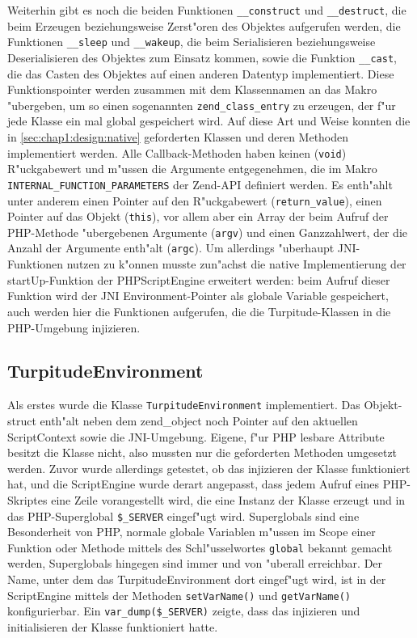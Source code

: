 Weiterhin gibt es noch die beiden Funktionen
\texttt{\_\_construct} und \texttt{\_\_destruct}, die beim Erzeugen beziehungsweise Zerst"oren des Objektes aufgerufen werden,
die Funktionen \texttt{\_\_sleep} und \texttt{\_\_wakeup}, die beim Serialisieren beziehungsweise Deserialisieren des Objektes zum
Einsatz kommen, sowie die Funktion \texttt{\_\_cast}, die das Casten des Objektes auf einen anderen Datentyp implementiert.
Diese Funktionspointer werden zusammen mit dem Klassennamen an das Makro "ubergeben, um so einen sogenannten \texttt{zend\_class\_entry}
zu erzeugen, der f"ur jede Klasse ein mal global gespeichert wird.
Auf diese Art und Weise konnten die in 
\ref{sec:chap1:design:native} geforderten Klassen und deren Methoden implementiert werden. Alle Callback-Methoden haben keinen (\texttt{void})
R"uckgabewert und m"ussen die Argumente entgegenehmen, die im Makro \texttt{INTERNAL\_FUNCTION\_PARAMETERS} der Zend-API definiert werden.
Es enth"ahlt unter anderem einen Pointer auf den R"uckgabewert (\texttt{return\_value}), einen Pointer auf das Objekt (\texttt{this}), vor
allem aber ein Array der beim Aufruf der PHP-Methode "ubergebenen Argumente (\texttt{argv}) und einen Ganzzahlwert, der die Anzahl
der Argumente enth"alt (\texttt{argc}).
Um allerdings "uberhaupt JNI-Funktionen nutzen zu k"onnen musste zun"achst die native Implementierung der startUp-Funktion der PHPScriptEngine 
erweitert werden: beim Aufruf dieser Funktion
wird der JNI Environment-Pointer als globale Variable gespeichert, auch werden hier die Funktionen aufgerufen, die die Turpitude-Klassen
in die PHP-Umgebung injizieren.

\subsection{TurpitudeEnvironment}
\label{sec:chap1:impl:3}

Als erstes wurde die Klasse \texttt{TurpitudeEnvironment} implementiert. Das Objekt-struct enth"alt neben dem zend\_object noch Pointer
auf den aktuellen ScriptContext sowie die JNI-Umgebung. Eigene, f"ur PHP lesbare Attribute besitzt die Klasse nicht, also mussten
nur die geforderten Methoden umgesetzt werden. Zuvor wurde allerdings getestet, ob das injizieren der Klasse funktioniert hat, und die
ScriptEngine wurde derart angepasst, dass jedem Aufruf eines PHP-Skriptes eine Zeile vorangestellt wird, die eine Instanz der Klasse
erzeugt und in das PHP-Superglobal \texttt{\$\_SERVER} eingef"ugt wird. Superglobals sind eine Besonderheit von PHP, normale globale
Variablen m"ussen im Scope einer Funktion oder Methode mittels des Schl"usselwortes \texttt{global} bekannt gemacht werden, Superglobals
hingegen sind immer und von "uberall erreichbar. Der Name, unter dem das TurpitudeEnvironment dort eingef"ugt wird, ist in der ScriptEngine
mittels der Methoden \texttt{setVarName()} und \texttt{getVarName()} konfigurierbar. Ein \texttt{var\_dump(\$\_SERVER)} zeigte, dass das
injizieren und initialisieren der Klasse funktioniert hatte.

